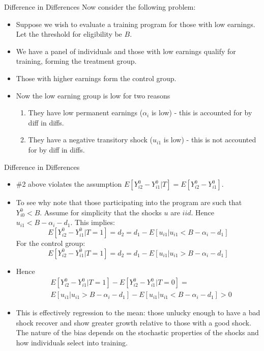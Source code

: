 \documentclass[xcolor=pdftex,dvipsnames,table,mathserif,aspectratio=169]{beamer}
\begin{document}
\begin{frame}{Difference in Differences}
Now consider the following problem:
\begin{itemize}
\item Suppose we wish to evaluate a training program for those with low
earnings. Let the threshold for eligibility be $B$.
\item We have a panel of individuals and those with low earnings qualify for
training, forming the treatment group.
\item Those with higher earnings form the control group. 
\item Now the low earning group is low for two reasons
\begin{enumerate}
\item They have low permanent earnings ($\alpha_i$ is low) - this is accounted for by diff in diffs.
\item They have a negative transitory shock ($u_{i1}$ is low) - this is not accounted for by diff in diffs.
\end{enumerate} 
\end{itemize}
\end{frame} 

\begin{frame}{Difference in Differences}
\begin{itemize}
\item  \#2 above violates the assumption {\small $E[Y_{i2}^0 - Y_{i1}^0 | T] = E[Y_{i2}^0 - Y_{i1}^0]$}. 
\item To see why note that those participating into the program are such
that {\small $Y_{i0}^0 < B$}. Assume for simplicity that the shocks {\small $u$} are {\small $iid$}. Hence {\small $u_{i1} < B- \alpha_i - d_1$}. 
This implies: 
{\small $$E[Y_{i2}^0 - Y_{i1}^0 | T=1] = d_2 = d_1 - E[u_{i1}| u_{i1} <  B-\alpha_i - d_1]$$}
For the control group:
{\small $$E[Y_{i2}^0 - Y_{i1}^0 | T=1] = d_2 = d_1 - E[u_{i1}| u_{i1} >  B-\alpha_i - d_1]$$}
\item Hence
\begin{align*}
& E[Y_{i2}^0 - Y_{i1}^0 | T=1] - E[Y_{i2}^0 - Y_{i1}^0 | T=0] =\\
&  E[u_{i1} | u_{i1} >  B-\alpha_i - d_1] - E[u_{i1} | u_{i1} < B-\alpha_i - d_1]  >0
  \end{align*}
 \item This is effectively regression to the mean: those unlucky enough to have a bad shock recover and show greater growth relative to those with a good shock. The nature of the bias depends on the stochastic properties of the shocks and how individuals select into training.
\end{itemize}
\end{frame} 
\end{document}

